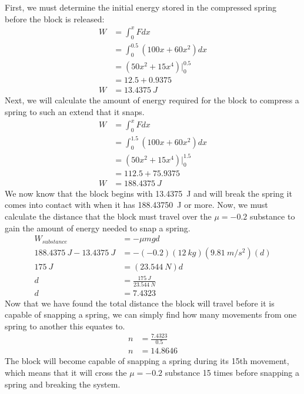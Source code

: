 \begin{solution}
First, we must determine the initial energy stored in the compressed spring before the block is released:
\begin{align*}
W &= \int_{0}^{x}Fdx\\
&= \int_{0}^{0.5}(100x+60x^2)dx\\
&= (50x^2+15x^4)|_0^{0.5}\\
&= 12.5+0.9375\\
W&=\SI{13.4375}{J}
\end{align*}
Next, we will calculate the amount of energy required for the block to compress a spring to such an extend that it snaps.
\begin{align*}
W &= \int_{0}^{x}Fdx\\
&= \int_{0}^{1.5}(100x+60x^2)dx\\
&= (50x^2+15x^4)|_0^{1.5}\\
&= 112.5+75.9375\\
W&=\SI{188.4375}{J}
\end{align*}	
We now know that the block begins with \SI{13.4375}{J} and will break the spring it comes into contact with when it has \SI{188.43750}{J} or more. Now, we must calculate the distance that the block must travel over the $\mu = -0.2$ substance to gain the amount of energy needed to snap a spring.
\begin{align*}
W_{substance}& = -\mu mgd\\
\SI{188.4375}{J}-\SI{13.4375}{J}&= -(-0.2)(\SI{12}{kg})(\SI{9.81}{m/s^2})(d)\\
\SI{175}{J} &= (\SI{23.544}{N})d\\
d&=\frac{\SI{175}{J}}{\SI{23.544}{N}}\\
d&=7.4323 
\end{align*}
Now that we have found the total distance the block will travel before it is capable of snapping a spring, we can simply find how many movements from one spring to another this equates to.
\begin{align*}
n&=\frac{7.4323}{0.5}\\
n&=14.8646
\end{align*}
The block will become capable of snapping a spring during its 15th movement, which means that it will cross the $\mu = -0.2$ substance 15 times before snapping a spring and breaking the system.
\end{solution}



